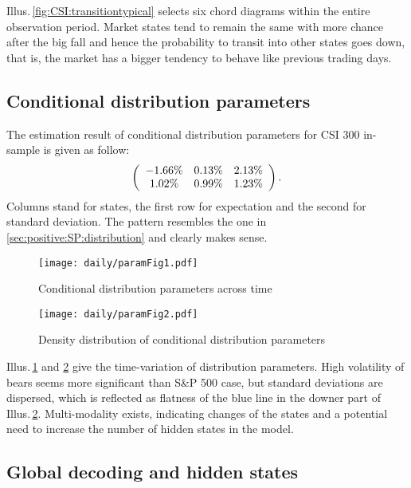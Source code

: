 Illus.\,\ref{fig:CSI:transitiontypical} selects six chord diagrams within the entire observation period.
Market states tend to remain the same with more chance after the big fall and
hence the probability to transit into other states goes down,
that is, the market has a bigger tendency to behave like previous trading days.


\subsection{Conditional distribution parameters}
\label{sec:positive:CSI:distribution}
The estimation result of conditional distribution parameters for
CSI 300 in-sample is given as follow:
        \begin{equation}
        \left (
        \begin{array}{c c c}
        -1.66\%  &  0.13\%  &  2.13\%  \\
         1.02\%  &  0.99\%  &  1.23\%  \\
        \end{array}
        \right ).
        \end{equation}
Columns stand for states, the first row for expectation and the second for standard deviation.
The pattern resembles the one in \ref{sec:positive:SP:distribution} and clearly makes sense.


        \begin{figure}[!hbt]
        \center
        \texttt{[image: daily/paramFig1.pdf]}
        \caption{Conditional distribution parameters across time}
        \label{fig:CSI:distscatter}
        \end{figure}

        \begin{figure}[!hbt]
        \center
        \texttt{[image: daily/paramFig2.pdf]}
        \caption{Density distribution of conditional distribution parameters}
        \label{fig:CSI:distdist}
        \end{figure}
Illus.\,\ref{fig:CSI:distscatter} and \ref{fig:CSI:distdist} give 
the time-variation of distribution parameters.
High volatility of bears seems more significant than S\&P 500 case, 
but standard deviations are dispersed, 
which is reflected as flatness of the blue line in the downer part of Illus.\,\ref{fig:CSI:distdist}.
Multi-modality exists, indicating changes of the states and 
a potential need to increase the number of hidden states in the model.


\subsection{Global decoding and hidden states}
\label{sec:positive:CSI:states}

